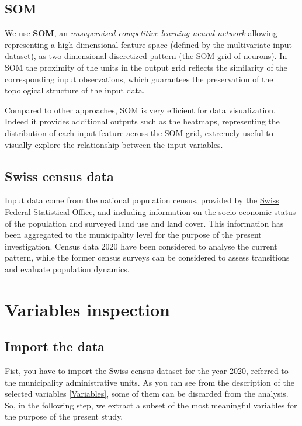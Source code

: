 \documentclass[
]{book}
\begin{document}
\hypertarget{som}{%
\subsection{SOM}\label{som}}

We use \textbf{SOM}, an \emph{unsupervised competitive learning neural network} allowing representing a high-dimensional feature space (defined by the multivariate input dataset), as two-dimensional discretized pattern (the SOM grid of neurons).
In SOM the proximity of the units in the output grid reflects the similarity of the corresponding input observations, which guarantees the preservation of the topological structure of the input data.

Compared to other approaches, SOM is very efficient for data visualization.
Indeed it provides additional outputs such as the heatmaps, representing the distribution of each input feature across the SOM grid, extremely useful to visually explore the relationship between the input variables.

\hypertarget{swiss-census-data}{%
\subsection{Swiss census data}\label{swiss-census-data}}

Input data come from the national population census, provided by the \href{https://www.bfs.admin.ch/bfs/en/home.html}{Swiss Federal Statistical Office}, and including information on the socio-economic status of the population and surveyed land use and land cover.
This information has been aggregated to the municipality level for the purpose of the present investigation.
Census data 2020 have been considered to analyse the current pattern, while the former census surveys can be considered to assess transitions and evaluate population dynamics.

\hypertarget{variables-inspection}{%
\section{Variables inspection}\label{variables-inspection}}

\hypertarget{import-the-data}{%
\subsection{Import the data}\label{import-the-data}}

Fist, you have to import the Swiss census dataset for the year 2020, referred to the municipality administrative units.
As you can see from the description of the selected variables \autoref{Variables}, some of them can be discarded from the analysis.
So, in the following step, we extract a subset of the most meaningful variables for the purpose of the present study.
\end{document}
